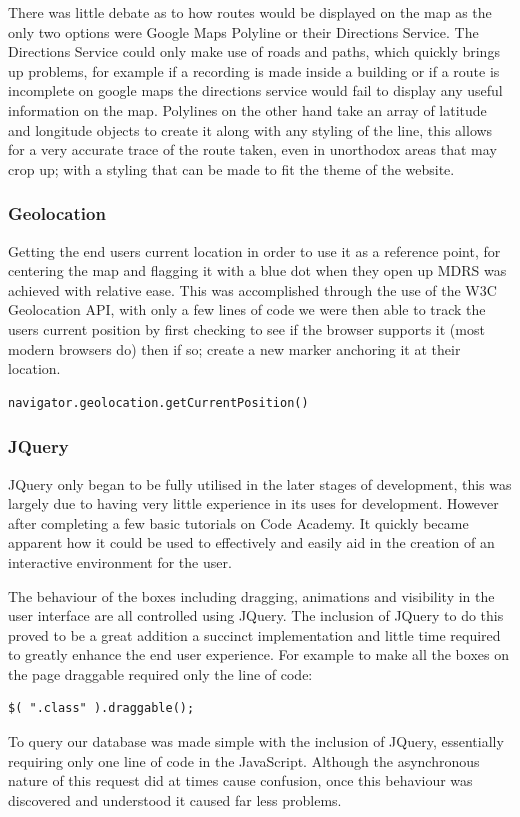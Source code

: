 \documentclass{l3proj}
\begin{document}
There was little debate as to how routes would be displayed on the map as the only two options were Google Maps Polyline or their Directions Service. The Directions Service could only make use of roads and paths, which quickly brings up problems, for example if a recording is made inside a building or if a route is incomplete on google maps the directions service would fail to display any useful information on the map. Polylines on the other hand take an array of latitude and longitude objects to create it along with any styling of the line, this allows for a very accurate trace of the route taken, even in unorthodox areas that may crop up; with a styling that can be made to fit the theme of the website.

\subsubsection{Geolocation}		Getting the end users current location in order to use it as a reference point, for centering the map and flagging it with a blue dot when they open up MDRS was achieved with relative ease. This was accomplished through the use of the \gls{W3C} Geolocation API, with only a few lines of code we were then able to track the users current position by first checking to see if the browser supports it (most modern browsers do) then if so; create a new marker anchoring it at their location.
\begin{verbatim}
navigator.geolocation.getCurrentPosition()
\end{verbatim}

\subsubsection{JQuery}		JQuery only began to be fully utilised in the later stages of development, this was largely due to having very little experience in its uses for development. However after completing a few basic tutorials on Code Academy. It quickly became apparent how it could be used to effectively and easily aid in the creation of an interactive environment for the user.

The behaviour of the boxes including dragging, animations and visibility in the user interface are all controlled using JQuery. The inclusion of JQuery to do this proved to be a great addition a succinct implementation and little time required to greatly enhance the end user experience. For example to make all the boxes on the page draggable required only the line of code:
\begin{verbatim}
$( ".class" ).draggable();
\end{verbatim}
To query our database was made simple with the inclusion of JQuery, essentially requiring only one line of code in the JavaScript. Although the asynchronous nature of this request did at times cause confusion, once this behaviour was discovered and understood it caused far less problems.
\end{document}
